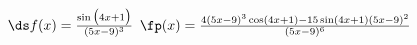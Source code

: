 {$\ds f(x) = \frac{\sin\big(4x+1\big)}{(5x-9)^3}$}
{$\fp(x) = \frac{4(5x-9)^3\cos(4x+1)-15\sin(4x+1)(5x-9)^2}{(5x-9)^6}$
}